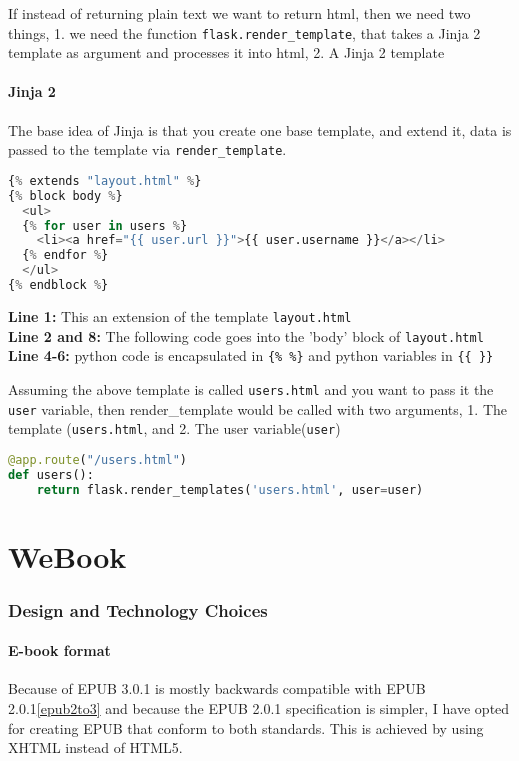 \documentclass[]{report}   %
\begin{document}
If instead of returning plain text we want to return html, then we need two
things, 1. we need the function \texttt{flask.render\_template}, that takes a Jinja 2 template as argument and processes it into html, 2. A Jinja 2 template

\subsubsection{Jinja 2}
The base idea of Jinja is that you create one base template, and extend it,
data is passed to the template via \texttt{render\_template}. 


\begin{lstlisting}[language=python]
{% extends "layout.html" %}
{% block body %}
  <ul>
  {% for user in users %}
    <li><a href="{{ user.url }}">{{ user.username }}</a></li>
  {% endfor %}
  </ul>
{% endblock %}
\end{lstlisting}

\textbf{Line 1:} This an extension of the template \texttt{layout.html} \\
\textbf{Line 2 and 8:} The following code goes into the 'body' block of
\texttt{layout.html} \\
\textbf{Line 4-6:} python code is encapsulated in \texttt{\{\% \%\}} and python
variables in \texttt{\{\{ \}\}}

Assuming the above template is called \texttt{users.html} and you want to pass
it the \texttt{user} variable, then render\_template would be called with two
arguments, 1. The template (\texttt{users.html}, and 2. The user
variable(\texttt{user})

\begin{lstlisting}[language=python]
@app.route("/users.html")
def users():
    return flask.render_templates('users.html', user=user)
\end{lstlisting}




\chapter{WeBook}

\subsection{Design and Technology Choices}
\subsubsection{E-book format}
Because of EPUB 3.0.1 is mostly backwards compatible with EPUB
2.0.1\ref{epub2to3} and because the EPUB 2.0.1 specification is simpler, I have
opted for creating EPUB that conform to both standards. This is achieved by
using XHTML instead of HTML5.
\end{document}

